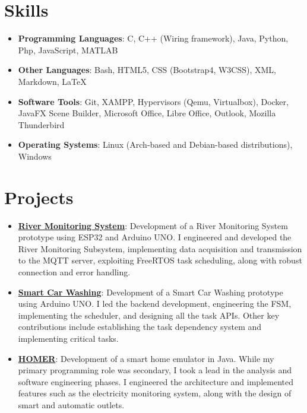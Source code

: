 \documentclass[letterpaper,11pt]{article}
\newcommand{\resumeItem}[2]{
  \item\small{
    \textbf{#1}{: #2 \vspace{-2pt}}
  }
}
\newcommand{\resumeSubItem}[2]{\resumeItem{#1}{#2}\vspace{-4pt}}
\newcommand{\resumeSubHeadingListStart}{\begin{itemize}[leftmargin=*]}
\newcommand{\resumeSubHeadingListEnd}{\end{itemize}}
\begin{document}
\section{Skills}
 \resumeSubHeadingListStart
   \item{
     \textbf{Programming Languages}{: C, C++ (Wiring framework), Java, Python, Php, JavaScript, MATLAB}
     \hfill
     }
     \item{
     \textbf{Other Languages}{: Bash, HTML5, CSS (Bootstrap4, W3CSS), XML, Markdown, LaTeX}
     \hfill
     }
     \item{
     \textbf{Software Tools}{: Git, XAMPP, Hypervisors (Qemu, Virtualbox), Docker, JavaFX Scene Builder, Microsoft Office, Libre Office, Outlook, Mozilla Thunderbird}
     \hfill
     }
     \item{
     \textbf{Operating Systems}{: Linux (Arch-based and Debian-based distributions), Windows}
     }
 \resumeSubHeadingListEnd

\section{Projects}
  \resumeSubHeadingListStart
    \resumeSubItem{\href{https://github.com/aleemont1/esiot-23-24-assignment3/}{River Monitoring System}}
      {Development of a River Monitoring System prototype using ESP32 and Arduino UNO.
       I engineered and developed the River Monitoring Subsystem, implementing data acquisition and
       transmission to the MQTT server, exploiting FreeRTOS task scheduling, along with robust connection and error handling.}
    \resumeSubItem{\href{https://github.com/aleemont1/esiot-23-24-assignment2/}{Smart Car Washing}}
      {Development of a Smart Car Washing prototype using Arduino UNO. 
      I led the backend development, engineering the FSM, implementing the scheduler, and designing all the task APIs. 
      Other key contributions include establishing the task dependency system and implementing critical tasks.}
    \resumeSubItem{\href{https://github.com/progetto-oop-22-23/OOP22-HOMER}{HOMER}}
      {Development of a smart home emulator in Java. 
        While my primary programming role was secondary, I took a lead in the analysis and software engineering phases. 
        I engineered the architecture and implemented features such as the electricity monitoring system, 
        along with the design of smart and automatic outlets.}
  \resumeSubHeadingListEnd
\end{document}
